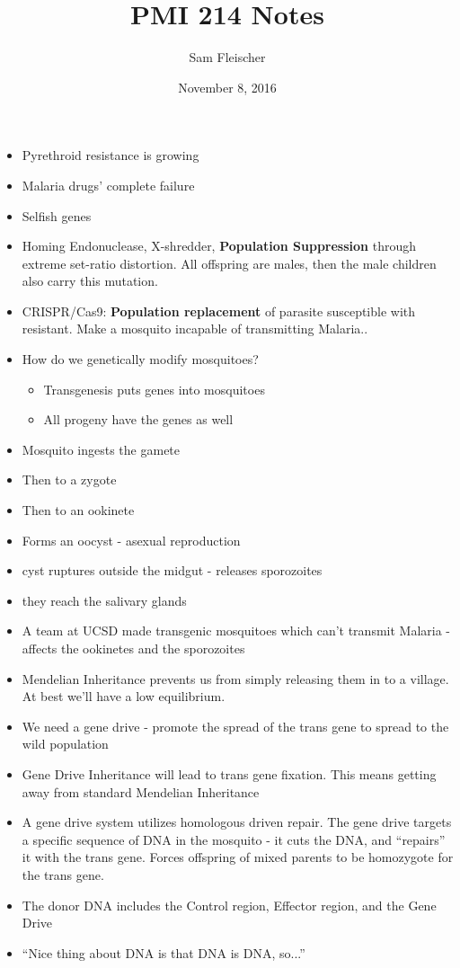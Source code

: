\documentclass{article}
\title{PMI 214 Notes}
\author{Sam Fleischer}
\date{November 8, 2016}
\begin{document}
    \maketitle

    \begin{itemize}
        \item Pyrethroid resistance is growing
        \item Malaria drugs' complete failure
        \item Selfish genes
        \item Homing Endonuclease, X-shredder, \textbf{Population Suppression} through extreme set-ratio distortion.  All offspring are males, then the male children also carry this mutation.
        \item CRISPR/Cas9: \textbf{Population replacement} of parasite susceptible with resistant.  Make a mosquito incapable of transmitting Malaria..
        \item How do we genetically modify mosquitoes?
        \begin{itemize}
            \item Transgenesis puts genes into mosquitoes
            \item All progeny have the genes as well
        \end{itemize}
        \item Mosquito ingests the gamete
        \item Then to a zygote
        \item Then to an ookinete
        \item Forms an oocyst - asexual reproduction
        \item cyst ruptures outside the midgut - releases sporozoites
        \item they reach the salivary glands
        \item A team at UCSD made transgenic mosquitoes which can't transmit Malaria - affects the ookinetes and the sporozoites
        \item Mendelian Inheritance prevents us from simply releasing them in to a village.  At best we'll have a low equilibrium.
        \item We need a gene drive - promote the spread of the trans gene to spread to the wild population
        \item Gene Drive Inheritance will lead to trans gene fixation.  This means getting away from standard Mendelian Inheritance
        \item A gene drive system utilizes homologous driven repair.  The gene drive targets a specific sequence of DNA in the mosquito - it cuts the DNA, and ``repairs'' it with the trans gene.  Forces offspring of mixed parents to be homozygote for the trans gene.
        \item The donor DNA includes the Control region, Effector region, and the Gene Drive
        \item ``Nice thing about DNA is that DNA is DNA, so...''
    \end{itemize}
\end{document}
